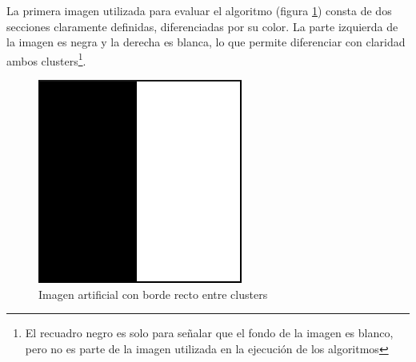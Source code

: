 La primera imagen utilizada para evaluar el algoritmo (figura \ref{fig:mitad_mitad})  consta de dos secciones claramente definidas, diferenciadas por su color. La parte izquierda de la imagen es negra y la derecha es blanca, lo que permite diferenciar con claridad ambos clusters\footnote{El recuadro negro es solo para señalar que el fondo de la imagen es blanco, pero no es parte de la imagen utilizada en la ejecución de los algoritmos}.


\begin{figure}[H]
\centering
\includegraphics[scale=0.3]{images/mitad_mitad_250x250.png}
\caption{Imagen artificial con borde recto entre clusters}
\label{fig:mitad_mitad}
\end{figure}

